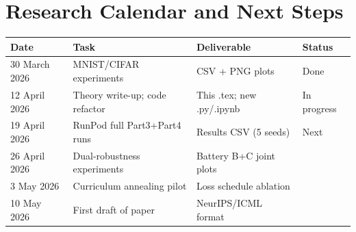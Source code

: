 \documentclass[11pt,a4paper]{article}
\begin{document}
\section{Research Calendar and Next Steps}
\label{sec:calendar}

\begin{table}[h]
\centering\small
\begin{tabular}{@{}llll@{}}
\toprule
\textbf{Date} & \textbf{Task} & \textbf{Deliverable} & \textbf{Status} \\
\midrule
30 March 2026 & MNIST/CIFAR experiments & CSV + PNG plots & Done \\
12 April 2026 & Theory write-up; code refactor & This .tex; new .py/.ipynb & In progress \\
19 April 2026 & RunPod full Part3+Part4 runs & Results CSV (5 seeds) & Next \\
26 April 2026 & Dual-robustness experiments & Battery B+C joint plots & \\
3 May 2026    & Curriculum annealing pilot & Loss schedule ablation & \\
10 May 2026   & First draft of paper & NeurIPS/ICML format & \\
\bottomrule
\end{tabular}
\end{table}
\end{document}
